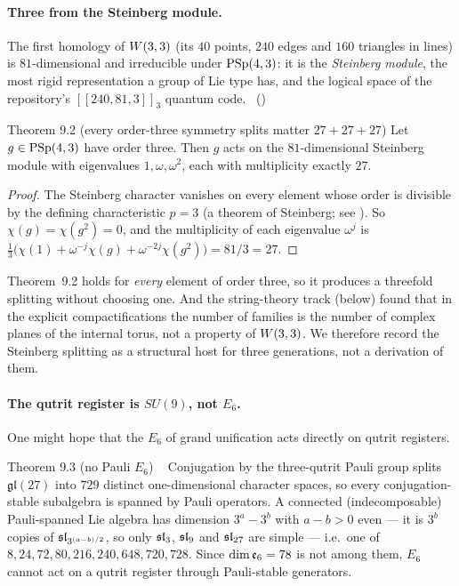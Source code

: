 \paragraph{Three from the Steinberg module.}
The first homology of $W(3,3)$ (its $40$ points, $240$ edges and $160$ triangles in lines) is
$81$-dimensional and irreducible under $\mathrm{PSp}(4,3)$: it is the \emph{Steinberg module}, the
most rigid representation a group of Lie type has, and the logical space of the
repository's $[[240,81,3]]_3$ quantum code. \tierC\ ()

\begin{result}{Theorem 9.2 (every order-three symmetry splits matter $27+27+27$) \hfill \tierT}
Let $g\in\mathrm{PSp}(4,3)$ have order three. Then $g$ acts on the $81$-dimensional Steinberg
module with eigenvalues $1,\omega,\omega^2$, each with multiplicity exactly $27$.
\end{result}

\begin{proof}
The Steinberg character vanishes on every element whose order is divisible by the
defining characteristic $p=3$ (a theorem of Steinberg; see \cite{Humphreys}). So $\chi(g)=\chi(g^2)=0$, and the
multiplicity of each eigenvalue $\omega^j$ is
$\tfrac13\bigl(\chi(1)+\omega^{-j}\chi(g)+\omega^{-2j}\chi(g^2)\bigr)=81/3=27$.
\end{proof}

\begin{boundary}
Theorem~9.2 holds for \emph{every} element of order three, so it produces a threefold
splitting without choosing one. And the string-theory track (below) found that in the
explicit compactifications the number of families is the number of complex planes of the
internal torus, not a property of $W(3,3)$. We therefore record the Steinberg splitting as a
structural host for three generations, not a derivation of them. \tierB
\end{boundary}

\paragraph{The qutrit register is $SU(9)$, not $E_6$.}
One might hope that the $E_6$ of grand unification acts directly on qutrit registers.

\begin{result}{Theorem 9.3 (no Pauli $E_6$) \hfill \tierT\ \tierC}
Conjugation by the three-qutrit Pauli group splits $\mathfrak{gl}(27)$ into $729$ distinct
one-dimensional character spaces, so every conjugation-stable subalgebra is spanned by
Pauli operators. A connected (indecomposable) Pauli-spanned Lie algebra has dimension $3^a-3^b$ with $a-b>0$ even ---
it is $3^b$ copies of $\mathfrak{sl}_{3^{(a-b)/2}}$, so only $\mathfrak{sl}_3$, $\mathfrak{sl}_9$ and $\mathfrak{sl}_{27}$ are simple --- i.e.\ one of
$8,24,72,80,216,240,648,720,728$. Since $\dim\mathfrak{e}_6=78$ is not among them, $E_6$ cannot act
on a qutrit register through Pauli-stable generators.
\end{result}

